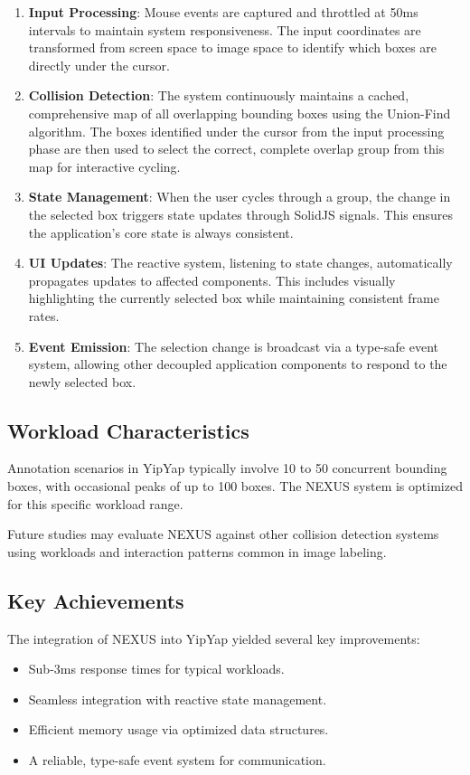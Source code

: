 \documentclass[10pt]{article}
\begin{document}
\begin{enumerate}
    \item \textbf{Input Processing}: Mouse events are captured and throttled at 50ms intervals to maintain system responsiveness. The input coordinates are transformed from screen space to image space to identify which boxes are directly under the cursor.

    \item \textbf{Collision Detection}: The system continuously maintains a cached, comprehensive map of all overlapping bounding boxes using the Union-Find algorithm. The boxes identified under the cursor from the input processing phase are then used to select the correct, complete overlap group from this map for interactive cycling.

    \item \textbf{State Management}: When the user cycles through a group, the change in the selected box triggers state updates through SolidJS signals. This ensures the application's core state is always consistent.

    \item \textbf{UI Updates}: The reactive system, listening to state changes, automatically propagates updates to affected components. This includes visually highlighting the currently selected box while maintaining consistent frame rates.

    \item \textbf{Event Emission}: The selection change is broadcast via a type-safe event system, allowing other decoupled application components to respond to the newly selected box.
\end{enumerate}

\subsection{Workload Characteristics}
Annotation scenarios in YipYap typically involve 10 to 50 concurrent bounding boxes, with occasional peaks of up to 100 boxes. The NEXUS system is optimized for this specific workload range.

Future studies may evaluate NEXUS against other collision detection systems using workloads and interaction patterns common in image labeling.

\subsection{Key Achievements}
The integration of NEXUS into YipYap yielded several key improvements:
\begin{itemize}
    \item Sub-3ms response times for typical workloads.
    \item Seamless integration with reactive state management.
    \item Efficient memory usage via optimized data structures.
    \item A reliable, type-safe event system for communication.
\end{itemize}
\end{document}
